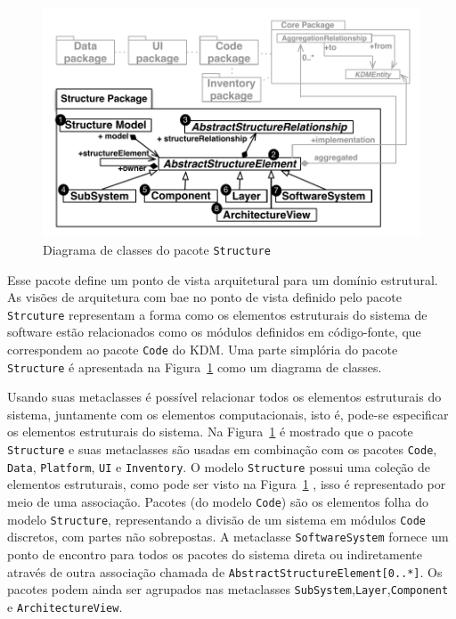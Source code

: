 \begin{figure}[h]
	\centering
	\caption{Diagrama de classes do pacote \texttt{Structure}\label{fig:structureModel}}
	\includegraphics[scale=0.67]{images/StructurePackageFigure}
\end{figure}

Esse pacote define um ponto de vista arquitetural para um domínio estrutural. As visões de arquitetura com bae no ponto de vista definido pelo pacote \texttt{Strcuture} representam a forma como os elementos estruturais do sistema de software estão relacionados como os módulos definidos em código-fonte, que correspondem ao pacote \texttt{Code} do KDM. Uma parte simplória do pacote \texttt{Structure} é apresentada na Figura~\ref{fig:structureModel} como um diagrama de classes.

 Usando suas metaclasses é possível relacionar todos os elementos estruturais do sistema, juntamente com os elementos computacionais, isto é, pode-se especificar os elementos estruturais do sistema. Na Figura~\ref{fig:structureModel} é mostrado que o pacote \texttt{Structure} e suas metaclasses são usadas em combinação com os pacotes \texttt{Code}, \texttt{Data}, \texttt{Platform}, \texttt{UI} e \texttt{Inventory}. O modelo \texttt{Structure} possui uma coleção de elementos estruturais, como pode ser visto na Figura~\ref{fig:structureModel} , isso é representado por meio de uma associação. Pacotes (do modelo \texttt{Code}) são os elementos folha do modelo \texttt{Structure}, representando a divisão de um sistema em módulos \texttt{Code} discretos, com partes não sobrepostas. A metaclasse \texttt{SoftwareSystem} fornece um ponto de encontro para todos os pacotes do sistema direta ou indiretamente através de outra associação chamada de \texttt{AbstractStructureElement[0..*]}. Os pacotes podem ainda ser agrupados nas metaclasses \texttt{SubSystem},\texttt{Layer},\texttt{Component} e \texttt{ArchitectureView}. 
 
